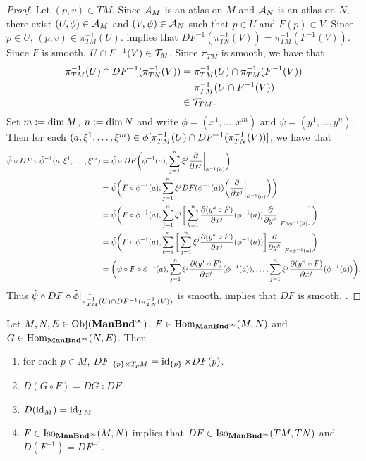 \documentclass{book}
\begin{document}
\begin{proof}
	Let $(p,v) \in TM$. Since $\mathcal{A}_M$ is an atlas on $M$ and $\mathcal{A}_N$ is an atlas on $N$, there exist $(U, \phi) \in \mathcal{A}_M$ and $(V, \psi) \in \mathcal{A}_N$ such that $p \in U$ and $F(p) \in V$. Since $p \in U$, $(p,v) \in \pi_{TM}^{-1}(U)$.  implies that $DF^{-1}(\pi_{TN}^{-1}(V)) = \pi_{TM}^{-1}(F^{-1}(V))$. Since $F$ is smooth, $U \cap F^{-1}(V) \in \mathcal{T}_M$. Since $\pi_{TM}$ is smooth, we have that 
	\begin{align*}
		\pi_{TM}^{-1}(U) \cap DF^{-1}(\pi_{TN}^{-1}(V)) 
		& = \pi_{TM}^{-1}(U) \cap \pi_{TM}^{-1}(F^{-1}(V)) \\
		& = \pi_{TM}^{-1}(U \cap F^{-1}(V)) \\
		& \in \mathcal{T}_{TM}.
	\end{align*}
	Set $m \vcentcolon= \dim M$, $n \vcentcolon= \dim N$ and write $\phi = (x^1, \ldots, x^m)$ and $\psi = (y^1, \ldots, y^n)$.  Then for each $(a, \xi^1, \ldots, \xi^m) \in \tilde{\phi}[\pi_{TM}^{-1}(U) \cap DF^{-1}(\pi_{TN}^{-1}(V))]$, we have that
	\begin{align*}
		\tilde{\psi} \circ DF \circ \tilde{\phi}^{-1}(a, \xi^1, \ldots, \xi^m)
		& = \tilde{\psi} \circ DF\bigg(\phi^{-1}(a), \sum_{j=1}^n \xi^j \frac{\partial}{\partial x^j} \bigg|_{\phi^{-1}(a)} \bigg) \\
		& =  \tilde{\psi} \bigg(F \circ \phi^{-1}(a), \sum_{j=1}^n \xi^j DF(\phi^{-1}(a)) \bigg( \frac{\partial}{\partial x^j} \bigg|_{\phi^{-1}(a)} \bigg) \bigg) \\
		& = \tilde{\psi} \bigg(F \circ \phi^{-1}(a), \sum_{j=1}^n \xi^j \bigg[ \sum_{k=1}^n \frac{\partial (y^k \circ F)}{\partial x^j}(\phi^{-1}(a)) \frac{\partial}{\partial y^k} \bigg|_{F \circ \phi^{-1}(a)} \bigg]  \bigg) \\
		& = \tilde{\psi} \bigg(F \circ \phi^{-1}(a),  \sum_{k=1}^n \bigg[  \sum_{j=1}^n \xi^j \frac{\partial (y^k \circ F)}{\partial x^j}(\phi^{-1}(a))  \bigg] \frac{\partial}{\partial y^k} \bigg|_{F \circ \phi^{-1}(a)}  \bigg) \\
		& = \bigg( \psi \circ F \circ \phi^{-1}(a),  \sum_{j=1}^n \xi^j \frac{\partial (y^1 \circ F)}{\partial x^j}(\phi^{-1}(a)), \ldots, \sum_{j=1}^n \xi^j \frac{\partial (y^n \circ F)}{\partial x^j}(\phi^{-1}(a))\bigg).
	\end{align*}
	Thus $\tilde{\psi} \circ DF \circ \tilde{\phi}|_{\pi_{TM}^{-1}(U) \cap DF^{-1}(\pi_{TN}^{-1}(V))}^{-1}$ is smooth.  implies that $DF$ is smooth. .
\end{proof}

\begin{ex}
	Let $M,N, E \in \operatorname{Obj}(\operatorname*{\text{\textbf{ManBnd}}^{\infty}})$, $F \in \operatorname{Hom}_{\operatorname*{\text{\textbf{ManBnd}}^{\infty}}}(M, N)$ and $G \in \operatorname{Hom}_{\operatorname*{\text{\textbf{ManBnd}}^{\infty}}}(N, E)$. Then
	\begin{enumerate}
		\item for each $p \in M$, $DF|_{\{p\} \times T_pM} = \operatorname{id}_{\{p\}} \times DF(p)$.
		\item $D(G \circ F) = DG \circ DF$
		\item $D(\operatorname{id}_M) = \operatorname{id}_{TM}$
		\item $F \in \operatorname{Iso}_{\operatorname*{\text{\textbf{ManBnd}}^{\infty}}}(M, N)$ implies that $DF \in \operatorname{Iso}_{\operatorname*{\text{\textbf{ManBnd}}^{\infty}}}(TM, TN)$ and $D(F^{-1}) = DF^{-1}$. 
	\end{enumerate}
\end{ex}
\end{document}
